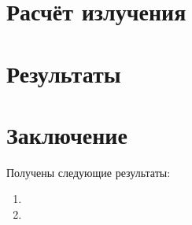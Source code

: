 \section{Расчёт излучения}




\section{Результаты}




\FloatBarrier
\section{Заключение}
 

Получены следующие результаты:
\begin{enumerate}
\item 
\item 
\end{enumerate}


\clearpage
